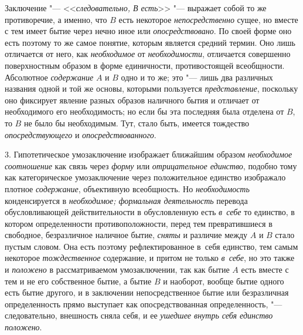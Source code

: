 Заключение "--- <<{\em следовательно, В есть}>>
"--- выражает собой то же противоречие, а именно, что
$B$ есть некоторое {\em непосредственно}
сущее, но вместе с тем имеет бытие через нечно иное или
{\em опосредствовано}.
По своей форме оно есть поэтому то же самое понятие, которым
является средний термин. Оно лишь отличается от него, как
{\em необходимое} от {\em необходимости},
отличается совершенно поверхностным образом в форме
единичности, противостоящей всеобщности. Абсолютное
{\em содержание} $A$ и $B$ одно и то же;
это "--- лишь два различных названия одной и той же основы,
которыми пользуется {\em представление},
поскольку оно фиксирует явление разных образов наличного
бытия и отличает от необходимого его необходимость; но если бы эта
последняя была отделена от $B$, то $B$ не было бы необходимым.
Тут, стало быть, имеется тождество {\em опосредствующего} и
{\em опосредствованного}.

3. Гипотетическое умозаключение изображает ближайшим образом
{\em необходимое соотношение}
как связь через {\em форму} или {\em отрицательное единство},
подобно тому как категорическое умозаключение через
положительное единство изображало плотное
{\em содержание}, объективную всеобщность. Но {\em необходимость}
конденсируется в {\em необходимое; формальная деятельность}
перевода обусловливающей действительности в обусловленную есть {\em в~себе} то
единство, в котором определенности противоположности, перед тем
превратившиеся в свободное, безразличное наличное бытие,
{\em сняты} и различие между $A$ и $B$ стало пустым
словом. Она есть поэтому рефлектированное в~себя единство,
тем самым некоторое {\em тождественное}
содержание, и притом не только {\em в~себе}, но это также и {\em положено} в
рассматриваемом умозаключении, так как бытие $A$ есть вместе с тем
и не его собственное бытие, а бытие $B$ и наоборот,
вообще бытие одного есть бытие другого, и в заключении непосредственное
бытие или безразличная определенность прямо выступает как опосредствованная
определенность, "--- следовательно, внешность сняла себя, и ее
{\em ушедшее внутрь себя единство положено}.

